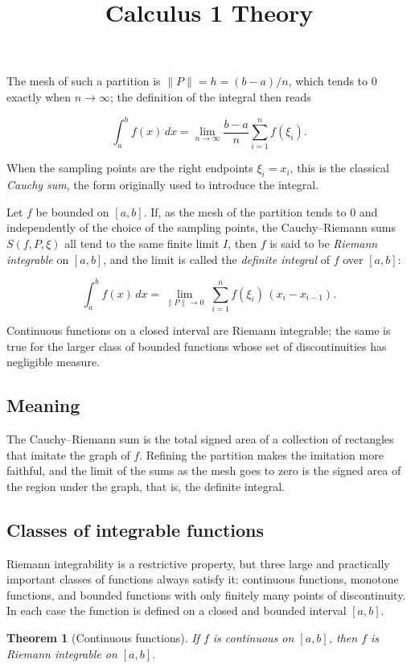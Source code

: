 \documentclass[11pt,a4paper]{article} \usepackage[T1]{fontenc}
\theoremstyle{plain} \newtheorem{theorem}{Theorem} \title{Calculus 1 Theory}
\begin{document}
The mesh of such a partition is $\|P\|=h=(b-a)/n$, which tends to $0$ exactly
when $n\to\infty$; the definition of the integral then reads

\[
\int_a^b f(x)\,dx = \lim_{n\to\infty}\frac{b-a}{n}\sum_{i=1}^{n} f(\xi_i).
\]

When the sampling points are the right endpoints $\xi_i=x_i$, this is the
classical \emph{Cauchy sum}, the form originally used to introduce the
integral.

\begin{definition}
 Let $f$ be bounded on $[a,b]$. If, as the mesh of the
partition tends to $0$ and independently of the choice of the sampling points,
the Cauchy--Riemann sums $S(f,P,\xi)$ all tend to the same finite limit $I$,
then $f$ is said to be \emph{Riemann integrable} on $[a,b]$, and the limit is
called the \emph{definite integral} of $f$ over $[a,b]$:

\[
\int_a^b f(x)\,dx = \lim_{\|P\|\to 0}\;\sum_{i=1}^{n} f(\xi_i)\,(x_i-x_{i-1}).
\]

\end{definition}

Continuous functions on a closed interval are Riemann integrable; the same is
true for the larger class of bounded functions whose set of discontinuities has
negligible measure.

\subsection*{Meaning}

The Cauchy--Riemann sum is the total signed area of a collection of rectangles
that imitate the graph of $f$. Refining the partition makes the imitation more
faithful, and the limit of the sums as the mesh goes to zero is the signed area
of the region under the graph, that is, the definite integral.

\subsection {Classes of integrable functions}

Riemann integrability is a restrictive property, but three large and
practically important classes of functions always satisfy it: continuous
functions, monotone functions, and bounded functions with only finitely many
points of discontinuity. In each case the function is defined on a closed and
bounded interval $[a,b]$.

\begin{theorem}
[Continuous functions] If $f$ is continuous on $[a,b]$, then $f$ is Riemann
integrable on $[a,b]$.
\end{theorem}
\end{document}
